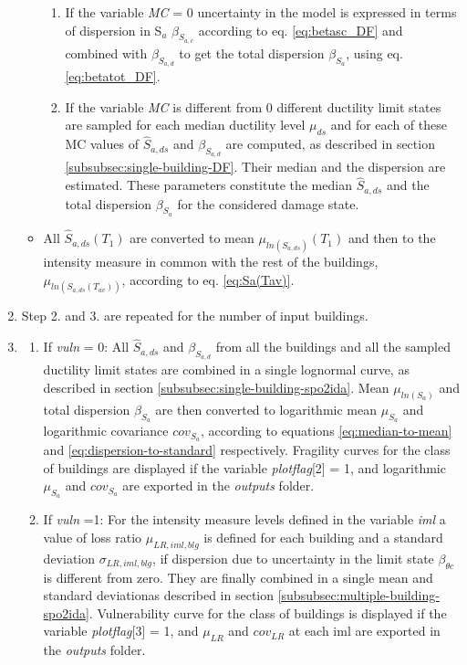 \begin{enumerate}
\begin{itemize}
\begin{enumerate}
\item If the variable \textit{MC} = 0 uncertainty in the model is expressed in terms of dispersion in S$_a$ $\beta_{S_{a, c}}$ according to eq. \ref{eq:betasc_DF} and combined with $\beta_{S_{a, d}}$ to get the total dispersion $\beta_{S_a}$, using eq. \ref{eq:betatot_DF}.
\item If the variable \textit{MC} is different from 0 different ductility limit states are sampled for each median ductility level $\mu_{ds}$ and for each of these MC values of $\hat{S}_{a,ds}$ and $\beta_{S_{a, d}}$ are computed, as described in section \ref{subsubsec:single-building-DF}. Their median and the dispersion are estimated. These parameters constitute the median $\hat{S}_{a,ds}$ and the total dispersion $\beta_{S_a}$ for the considered damage state. 
\end{enumerate}

\item All $\hat{S}_{a, ds}(T_1)$ are converted to mean $\mu_{ln(S_{a, ds})}(T_1)$ and then to the intensity measure in common with the rest of the buildings, $\mu_{ln(S_{a, ds}(T_{av}))}$, according to eq. \ref{eq:Sa(Tav)}.
\end{itemize}

\item Step 2. and 3. are repeated for the number of input buildings.

\item
\begin{enumerate}

\item If \textit{vuln} = 0: All $\hat{S}_{a,ds}$ and $\beta_{S_{a, d}}$ from all the buildings and all the sampled ductility limit states are combined in a single lognormal curve, as described in section \ref{subsubsec:single-building-spo2ida}. 
Mean $\mu_{ln(S_{a})}$ and total dispersion $\beta_{S_a}$ are then converted to logarithmic mean $\mu_{S_a}$ and logarithmic covariance $cov_{S_a}$, according to equations \ref{eq:median-to-mean} and \ref{eq:dispersion-to-standard} respectively.
Fragility curves for the class of buildings are displayed if the variable \textit{plotflag}[2] = 1, and logarithmic $\mu_{S_a}$ and $cov_{S_a}$ are exported in the \textit{outputs} folder.

\item If \textit{vuln} =1:  
For the intensity measure levels defined in the variable \textit{iml} a value of loss ratio $\mu_{LR, iml, blg}$ is defined for each building and a standard deviation $\sigma_{LR, iml, blg}$, if dispersion due to uncertainty in the limit state $\beta_{\theta c}$ is different from zero. They are finally combined in a single mean and standard deviationas described in section \ref{subsubsec:multiple-building-spo2ida}. Vulnerability curve for the class of buildings is displayed if the variable \textit{plotflag}[3] = 1, and $\mu_{LR}$ and $cov_{LR}$ at each iml are exported in the \textit{outputs} folder.
\end{enumerate}

\end{enumerate}
